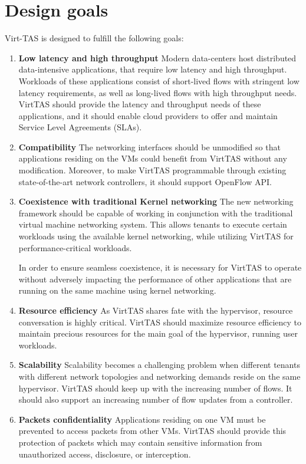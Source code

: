 
\section{Design goals}
Virt-TAS is designed to fulfill the following goals:

\begin{enumerate}
    \item \textbf{Low latency and high throughput} %
    Modern data-centers host distributed data-intensive applications, that require 
    low latency and high throughput. Workloads of these applications consist of short-lived 
    flows with stringent low latency requirements, as well as long-lived flows with 
    high throughput needs. VirtTAS should provide the latency and throughput needs 
    of these applications, and it should enable cloud providers to offer and maintain
    Service Level Agreements (SLAs). 
    
    \item \textbf{Compatibility} %
    The networking interfaces should be unmodified so that applications residing on 
    the VMs could benefit from VirtTAS without any modification.
    Moreover, to make VirtTAS programmable through existing state-of-the-art network controllers,
    it should support OpenFlow API.

    \item \textbf{Coexistence with traditional Kernel networking}
    The new networking framework should be capable of working in conjunction with the 
    traditional virtual machine networking system. This allows tenants to execute certain
    workloads using the available kernel networking, while utilizing VirtTAS for
    performance-critical workloads.
    
    In order to ensure seamless coexistence, it is 
    necessary for VirtTAS to operate without adversely impacting the performance of 
    other applications that are running on the same machine using kernel networking. 

    \item \textbf{Resource efficiency}
    As VirtTAS shares fate with the hypervisor, resource conversation is highly critical. 
    VirtTAS should maximize resource efficiency to maintain precious resources for the 
    main goal of the hypervisor, running user workloads.

    \item \textbf{Scalability} %
    Scalability becomes a challenging problem when different tenants with different network 
    topologies and networking demands reside on the same hypervisor. VirtTAS should keep up 
    with the increasing number of flows. It should also support an increasing number of flow 
    updates from a controller.

    \item \textbf{Packets confidentiality}
    Applications residing on one VM must be prevented to access packets from other VMs. 
    VirtTAS should provide this protection of packets which may contain 
    sensitive information from unauthorized access, disclosure, or interception.
\end{enumerate}

